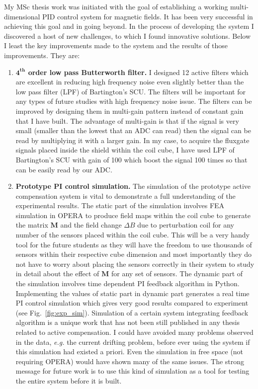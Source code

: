 My MSc thesis work was initiated with the goal of establishing a
working multi-dimensional PID control system for magnetic fields.  It
has been very successful in achieving this goal and in going beyond.
In the process of developing the system I discovered a host of new
challenges, to which I found innovative solutions.  Below I least the
key improvements made to the system and the results of those
improvements.  They are:
\begin{enumerate}
\item {\bf $\mathbf{4^{th}}$ order low pass Butterworth filter.}  I designed 12 active filters which are excellent in reducing high frequency noise even slightly better than the low pass filter (LPF) of Bartington's SCU. The filters will be important for any types of future studies with high frequency noise issue. The filters can be improved by designing them in multi-gain pattern instead of constant gain that I have built. The advantage of multi-gain is that if the signal is very small (smaller than the lowest that an ADC can read) then the signal can be read by multiplying it with a larger gain. In my case, to acquire the fluxgate signals placed inside the shield within the coil cube, I have used LPF of Bartington's SCU with gain of 100 which boost the signal 100 times so that can be easily read by our ADC.  

\item {\bf Prototype PI control simulation.}  The simulation of the prototype active compensation system is vital to demonstrate a full understanding of the experimental results. The static part of the simulation involves FEA simulation in OPERA to produce field maps within the coil cube to generate the matrix $\bm{M}$ and the field change $\Delta B$ due to perturbation coil for any number of the sensors placed within the coil cube. This will be a very handy tool for the future students as they will have the freedom to use thousands of sensors within their respective cube dimension and most importantly they do not have to worry about placing the sensors correctly in their system to study in detail about the effect of $\bm{M}$ for any set of sensors. The dynamic part of the simulation involves time dependent PI feedback algorithm in Python. Implementing the values of static part in dynamic part generates a real time PI control simulation which gives very good results compared to experiment (see Fig.~\ref{fig:exp_sim}).  Simulation of a certain system integrating feedback algorithm is a unique work that has not been still published in any thesis related to active compensation. I could have avoided many problems observed in the data, {\it e.g.} the current drifting problem, before ever using the system if this simulation had existed a priori. Even the simulation in free space (not requiring OPERA) would have shown many of the same issues. The strong message for future work is to use this kind of simulation as a tool for testing the entire system before it is built.



\end{enumerate}
